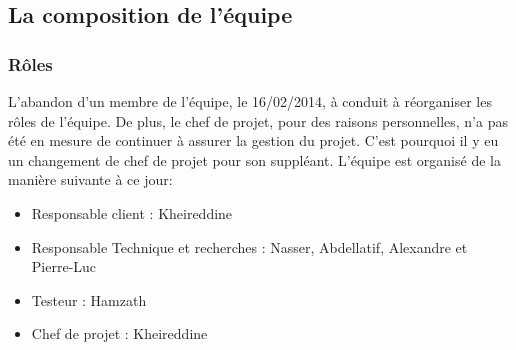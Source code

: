 \documentclass{../res/adr}
\begin{document}
  \subsection{La composition de l'équipe}
    \subsubsection{Rôles}
      L'abandon d'un membre de l'équipe, le 16/02/2014, à conduit à réorganiser les rôles de l'équipe. De plus, le chef de projet, pour des raisons personnelles, n'a pas été en mesure de continuer à assurer la gestion du projet. C'est pourquoi il y eu un changement de chef de projet pour son suppléant. L'équipe est organisé de la manière suivante à ce jour:

      \begin{itemize}
        \item Responsable client : Kheireddine
        \item Responsable Technique et recherches : Nasser, Abdellatif, Alexandre et Pierre-Luc
        \item Testeur : Hamzath
        \item Chef de projet : Kheireddine
      \end{itemize}
\end{document}
